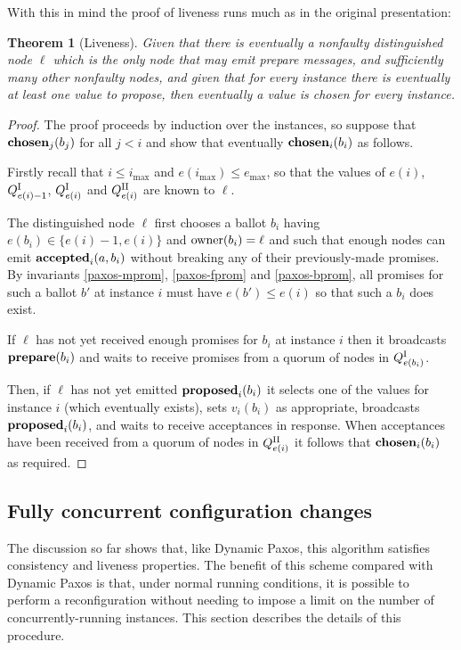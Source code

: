 \documentclass[journal]{IEEEtran}
\newtheorem{theorem}{Theorem}
\begin{document}
With this in mind the proof of liveness runs much as in the original
presentation:

\begin{theorem}[Liveness]\label{liveness-theorem} Given that there is
  eventually a nonfaulty distinguished node $\ell$ which is the only node that
  may emit prepare messages, and sufficiently many other nonfaulty nodes, and
  given that for every instance there is eventually at least one value to
propose, then eventually a value is chosen for every instance.  \end{theorem}

\begin{proof} The proof proceeds by induction over the instances, so suppose
that $\mathbf{chosen}_{j}(b_j)$ for all $j < i$ and show that eventually
$\mathbf{chosen}_{i}(b_i)$ as follows.

Firstly recall that $i \le i_{\mathrm{max}}$ and $e(i_{\mathrm{max}}) \le
e_{\mathrm{max}}$, so that the values of $e(i)$, ${Q}^\textrm{I}_{e(i)-1}$, ${Q}^\textrm{I}_{e(i)}$ and
${Q}^\textrm{II}_{e(i)}$ are known to $\ell$.

The distinguished node $\ell$ first chooses a ballot $b_i$ having $e(b_i) \in
\{ e(i) - 1, e(i) \}$ and $\mathrm{owner}(b_i) = \ell$ and such that enough nodes can
emit $\mathbf{accepted}_{i}(a,b_i)$ without breaking any of their previously-made promises.
By invariants \ref{paxos-mprom}, \ref{paxos-fprom} and \ref{paxos-bprom}, all
promises for such a ballot $b'$ at instance $i$ must have $e(b') \le e(i)$ so
that such a $b_i$ does exist.

If $\ell$ has not yet received enough promises for $b_i$ at instance $i$ then
it broadcasts $\mathbf{prepare}(b_i)$ and waits to receive promises from a quorum of nodes
in ${Q}^\textrm{I}_{e(b_i)}$.

Then, if $\ell$ has not yet emitted $\mathbf{proposed}_{i}(b_i)$ it selects one of the
values for instance $i$ (which eventually exists), sets $v_i(b_i)$ as
appropriate, broadcasts $\mathbf{proposed}_{i}(b_i)$, and waits to receive acceptances in
response. When acceptances have been received from a quorum of nodes in
${Q}^\textrm{II}_{e(i)}$ it follows that $\mathbf{chosen}_{i}(b_i)$ as required. \end{proof}

\subsection{Fully concurrent configuration changes}\label{fully-concurrent}

The discussion so far shows that, like Dynamic Paxos, this algorithm satisfies
consistency and liveness properties.  The benefit of this scheme compared with
Dynamic Paxos is that, under normal running conditions, it is possible to
perform a reconfiguration without needing to impose a limit on the number of
concurrently-running instances. This section describes the details of this
procedure.
\end{document}
